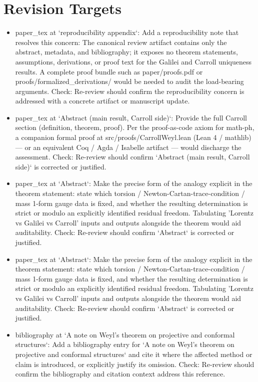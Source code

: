 \documentclass[11pt]{article}
\begin{document}
\section*{Revision Targets}
\begin{itemize}[leftmargin=*]
  \item [open] paper\_tex at `reproducibility appendix`: Add a reproducibility note that resolves this concern: The canonical review artifact contains only the abstract, metadata, and bibliography; it exposes no theorem statements, assumptions, derivations, or proof text for the Galilei and Carroll uniqueness results. A complete proof bundle such as paper/proofs.pdf or proofs/formalized\_derivations/ would be needed to audit the load-bearing arguments. Check: Re-review should confirm the reproducibility concern is addressed with a concrete artifact or manuscript update.
  \item [open] paper\_tex at `Abstract (main result, Carroll side)`: Provide the full Carroll section (definition, theorem, proof). Per the proof-as-code axiom for math-ph, a companion formal proof at src/proofs/CarrollWeyl.lean (Lean 4 / mathlib) — or an equivalent Coq / Agda / Isabelle artifact — would discharge the assessment. Check: Re-review should confirm `Abstract (main result, Carroll side)` is corrected or justified.
  \item [open] paper\_tex at `Abstract`: Make the precise form of the analogy explicit in the theorem statement: state which torsion / Newton-Cartan-trace-condition / mass 1-form gauge data is fixed, and whether the resulting determination is strict or modulo an explicitly identified residual freedom. Tabulating 'Lorentz vs Galilei vs Carroll' inputs and outputs alongside the theorem would aid auditability. Check: Re-review should confirm `Abstract` is corrected or justified.
  \item [open] paper\_tex at `Abstract`: Make the precise form of the analogy explicit in the theorem statement: state which torsion / Newton-Cartan-trace-condition / mass 1-form gauge data is fixed, and whether the resulting determination is strict or modulo an explicitly identified residual freedom. Tabulating 'Lorentz vs Galilei vs Carroll' inputs and outputs alongside the theorem would aid auditability. Check: Re-review should confirm `Abstract` is corrected or justified.
  \item [open] bibliography at `A note on Weyl's theorem on projective and conformal structures`: Add a bibliography entry for `A note on Weyl's theorem on projective and conformal structures` and cite it where the affected method or claim is introduced, or explicitly justify its omission. Check: Re-review should confirm the bibliography and citation context address this reference.
\end{itemize}
\end{document}
